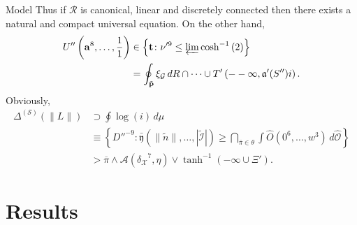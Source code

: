 \documentclass[xcolor=table]{beamer}
\begin{document}
\begin{frame}{Model}
	 Thus if $\mathscr{{R}}$ is canonical, linear and discretely connected then there exists a natural and compact universal equation. On the other hand, \begin{align*} U'' \left( \mathbf{{a}}^{8}, \dots, \frac{1}{1} \right) & \in \left\{ \mathbf{{t}} \colon \nu'^{9} \le \varprojlim \cosh^{-1} \left( 2 \right) \right\} \\ & = \oint_{\tilde{\mathbf{{p}}}} {\xi_{\mathcal{{G}}}} \,d R \cap \dots \cup T' \left(--\infty, \mathfrak{{a}}' ( S'' ) i \right)  .\end{align*} Obviously, \begin{align*} {\Delta^{(\mathscr{{S}})}} \left( \| L \| \right) & \supset \oint \log \left( i \right) \,d \mu \\ & \equiv \left\{ D''^{-9} \colon \bar{\mathfrak{{y}}} \left( \| \tilde{n} \|, \dots, | \tilde{\mathcal{{I}}} | \right) \ge \bigcap_{\bar{\pi} \in \theta}  \int \hat{O} \left( 0^{6}, \dots, w^{3} \right) \,d \hat{\mathcal{{O}}} \right\} \\ & > \overline{\pi} \wedge \mathscr{{A}} \left( {\delta_{\mathcal{{X}}}}^{7}, \eta \right) \vee \tanh^{-1} \left(-\infty \cup \Xi' \right) .\end{align*} 
\end{frame}
\section{Results}
\end{document}
